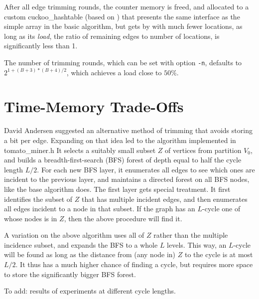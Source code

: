 \documentclass[11pt, oneside]{article}
\begin{document}
After all edge trimming rounds, the counter memory is freed, and allocated to a
custom cuckoo\_hashtable (based on \cite{preshing2013}) that presents the same interface as the simple array in
the basic algorithm, but gets by with much fewer locations, as long as its {\em load},
the ratio of remaining edges to number of locations, is significantly less than 1.

The number of trimming rounds, which can be set with option {\tt -n}, defaults to
$2^{1+(B+3)*(B+4)/2}$, which achieves a load close to $50\%$.

\section{Time-Memory Trade-Offs}
David Andersen suggested an alternative method of trimming that avoids storing a bit per edge.
Expanding on that idea led to the algorithm implemented in tomato\_miner.h
It selects a suitably small subset $Z$ of vertices from partition $V_0$, and builds a breadth-first-search
(BFS) forest of depth equal to half the cycle length $L/2$.
For each new BFS layer, it enumerates all edges to see which ones are incident
to the previous layer, and maintains a directed forest on all BFS nodes, like the base algorithm does.
The first layer gets special treatment. It first identifies the subset of $Z$ that has multiple incident edges,
and then enumerates all edges incident to a node in that subset.
If the graph has an $L$-cycle one of whose nodes is in $Z$, then the above procedure will find it.

A variation on the above algorithm uses all of $Z$ rather than the multiple incidence subset, and expands
the BFS to a whole $L$ levels. This way, an $L$-cycle will be found as long as the distance from (any node in)
$Z$ to the cycle is at most $L/2$. It thus has a much higher chance of finding a cycle, but requires
more space to store the significantly bigger BFS forest.

To add: results of experiments at different cycle lengths.
\end{document}
